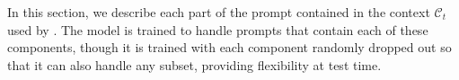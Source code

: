 
\label{sec:conditioning}

In this section, we describe each part of the prompt contained in the context $\mathcal{C}_t$ used by \MethodName{}. The model is trained to handle prompts that contain each of these components, though it is trained with each component randomly dropped out so that it can also handle any subset, providing flexibility at test time.

